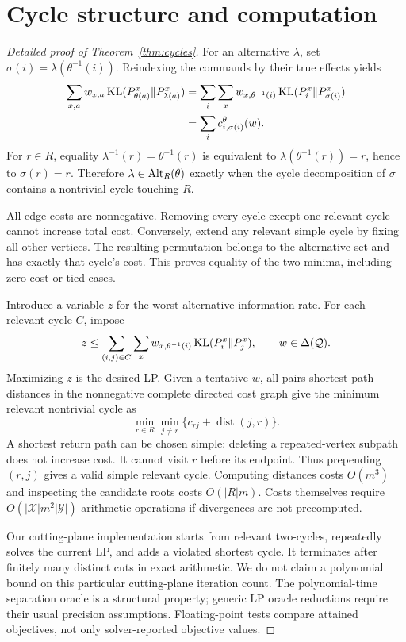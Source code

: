 \section{Cycle structure and computation}\label{app:cycles}
\begin{proof}[Detailed proof of Theorem~\ref{thm:cycles}]
For an alternative $\lambda$, set $\sigma(i)=\lambda(\theta^{-1}(i))$. Reindexing the commands by their true effects yields
\begin{align}
\sum_{x,a}w_{x,a}\operatorname{KL}(P_{\theta(a)}^x\Vert P_{\lambda(a)}^x)
&=\sum_i\sum_xw_{x,\theta^{-1}(i)}\operatorname{KL}(P_i^x\Vert P_{\sigma(i)}^x)\\
&=\sum_i c_{i,\sigma(i)}^\theta(w).
\end{align}
For $r\in R$, equality $\lambda^{-1}(r)=\theta^{-1}(r)$ is equivalent to $\lambda(\theta^{-1}(r))=r$, hence to $\sigma(r)=r$. Therefore $\lambda\in\operatorname{Alt}_R(\theta)$ exactly when the cycle decomposition of $\sigma$ contains a nontrivial cycle touching $R$.

All edge costs are nonnegative. Removing every cycle except one relevant cycle cannot increase total cost. Conversely, extend any relevant simple cycle by fixing all other vertices. The resulting permutation belongs to the alternative set and has exactly that cycle's cost. This proves equality of the two minima, including zero-cost or tied cases.

Introduce a variable $z$ for the worst-alternative information rate. For each relevant cycle $C$, impose
\begin{equation}
z\le\sum_{(i,j)\in C}\sum_xw_{x,\theta^{-1}(i)}\operatorname{KL}(P_i^x\Vert P_j^x),\qquad w\in\Delta(\mathcal Q).
\end{equation}
Maximizing $z$ is the desired LP. Given a tentative $w$, all-pairs shortest-path distances in the nonnegative complete directed cost graph give the minimum relevant nontrivial cycle as
\begin{equation}
\min_{r\in R}\min_{j\ne r}\{c_{rj}+\operatorname{dist}(j,r)\}.
\end{equation}
A shortest return path can be chosen simple: deleting a repeated-vertex subpath does not increase cost. It cannot visit $r$ before its endpoint. Thus prepending $(r,j)$ gives a valid simple relevant cycle. Computing distances costs $O(m^3)$ and inspecting the candidate roots costs $O(|R|m)$. Costs themselves require $O(|\mathcal X|m^2|\mathcal Y|)$ arithmetic operations if divergences are not precomputed.

Our cutting-plane implementation starts from relevant two-cycles, repeatedly solves the current LP, and adds a violated shortest cycle. It terminates after finitely many distinct cuts in exact arithmetic. We do not claim a polynomial bound on this particular cutting-plane iteration count. The polynomial-time separation oracle is a structural property; generic LP oracle reductions require their usual precision assumptions. Floating-point tests compare attained objectives, not only solver-reported objective values.
\end{proof}

